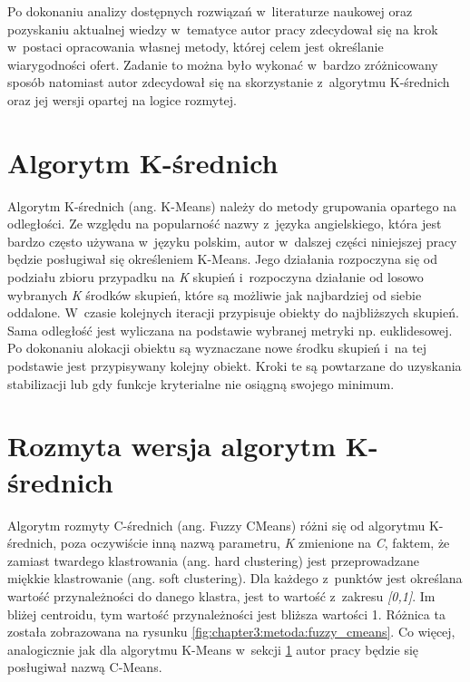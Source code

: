 \documentclass[../Kamil_Kowalewski_Main.tex]{subfiles}
\begin{document}
 {

    Po dokonaniu analizy dostępnych rozwiązań w~literaturze naukowej oraz pozyskaniu
    aktualnej wiedzy w~tematyce autor pracy zdecydował się na krok w~postaci
    opracowania własnej metody, której celem jest określanie wiarygodności ofert.
    Zadanie to można było wykonać w~bardzo zróżnicowany sposób natomiast autor
    zdecydował się na skorzystanie z~algorytmu K-średnich oraz jej wersji opartej na
    logice rozmytej.

    \section{Algorytm K-średnich}
    \label{chapter3:metoda:kmeans} {
        Algorytm K-średnich\cite{article:k_means} (ang. K-Means) należy do metody
        grupowania opartego na odległości. Ze względu na popularność nazwy z~języka
        angielskiego, która jest bardzo często używana w~języku polskim, autor
        w~dalszej części niniejszej pracy będzie posługiwał się określeniem K-Means.
        Jego działania rozpoczyna się od podziału zbioru przypadku na \textit{K}
        skupień i~rozpoczyna działanie od losowo wybranych \textit{K} środków skupień,
        które są możliwie jak najbardziej od siebie oddalone. W~czasie kolejnych
        iteracji przypisuje obiekty do najbliższych skupień. Sama odległość jest
        wyliczana na podstawie wybranej metryki np. euklidesowej. Po dokonaniu alokacji
        obiektu są wyznaczane nowe środku skupień i~na tej podstawie jest przypisywany
        kolejny obiekt. Kroki te są powtarzane do uzyskania stabilizacji lub gdy
        funkcje kryterialne nie osiągną swojego minimum.
    }

    \section{Rozmyta wersja algorytm K-średnich}
    \label{chapter3:metoda:fuzzy_cmeans} {
        Algorytm rozmyty C-średnich\cite{article:c_means} (ang. Fuzzy CMeans) różni się
        od algorytmu K-średnich, poza oczywiście inną nazwą parametru, \textit{K}
        zmienione na \textit{C}, faktem, że zamiast twardego klastrowania (ang. hard
        clustering) jest przeprowadzane miękkie klastrowanie (ang. soft clustering).
        Dla każdego z~punktów jest określana wartość przynależności do danego klastra,
        jest to wartość z~zakresu \textit{[0,1]}. Im bliżej centroidu, tym wartość
        przynależności jest bliższa wartości 1. Różnica ta została zobrazowana na
        rysunku \ref{fig:chapter3:metoda:fuzzy_cmeans}. Co więcej, analogicznie jak dla
        algorytmu K-Means w~sekcji \ref{chapter3:metoda:kmeans} autor pracy będzie się
        posługiwał nazwą C-Means.

}}
\end{document}

